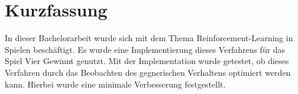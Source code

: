 \chapter{Kurzfassung}

In dieser Bachelorarbeit wurde sich mit dem Thema Reinforcement-Learning in Spielen beschäftigt. Es wurde eine Implementierung dieses Verfahrens für das Spiel Vier Gewinnt genutzt. Mit der  Implementation wurde getestet, ob dieses Verfahren durch das Beobachten des gegnerischen Verhaltens optimiert werden kann. Hierbei wurde eine minimale Verbesserung festgestellt.
